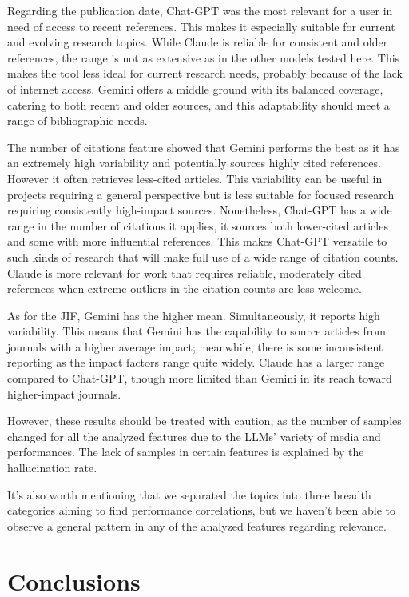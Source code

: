 \documentclass[runningheads]{llncs}
\begin{document}
Regarding the publication date, Chat-GPT was the most relevant for a user in need of access to recent references. This makes it especially suitable for current and evolving research topics. While Claude is reliable for consistent and older references, the range is not as extensive as in the other models tested here. This makes the tool less ideal for current research needs, probably because of the lack of internet access. Gemini offers a middle ground with its balanced coverage, catering to both recent and older sources, and this adaptability should meet a range of bibliographic needs.

The number of citations feature showed that Gemini performs the best as it has an extremely high variability and potentially sources highly cited references. However it often retrieves less-cited articles. This variability can be useful in projects requiring a general perspective but is less suitable for focused research requiring consistently high-impact sources. Nonetheless, Chat-GPT has a wide range in the number of citations it applies, it sources both lower-cited articles and some with more influential references. This makes Chat-GPT versatile to such kinds of research that will make full use of a wide range of citation counts.
Claude is more relevant for work that requires reliable, moderately cited references when extreme outliers in the citation counts are less welcome.

As for the JIF, Gemini has the higher mean. Simultaneously, it reports high variability. This means that Gemini has the capability to source articles from journals with a higher average impact; meanwhile, there is some inconsistent reporting as the impact factors range quite widely. Claude has a larger range compared to Chat-GPT, though more limited than Gemini in its reach toward higher-impact journals.

However, these results should be treated with caution, as the number of samples changed for all the analyzed features due to the LLMs' variety of media and performances. The lack of samples in certain features is explained by the hallucination rate.

It's also worth mentioning that we separated the topics into three breadth categories aiming to find performance correlations, but we haven't been able to observe a general pattern in any of the analyzed features regarding relevance.

\section{Conclusions}
\end{document}
